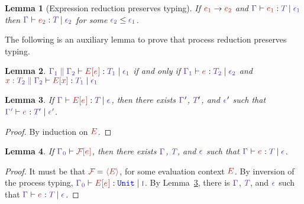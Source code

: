 \documentclass{article}
\newtheorem{lemma}{Lemma}
\begin{document}
\begin{lemma}[Expression reduction preserves typing]
  If $\E[1] \Reduces \E[2]$ and 
  $\HasType
      {\Ctx}
      {\E[1]}
      {\T}
      {\Eff[1]}$
  then 
  $\HasType
      {\Ctx}
      {\E[2]}
      {\T}
      {\Eff[2]}$
  for some $\Eff[2] \leq \Eff[1]$.
\end{lemma}

The following is an auxiliary lemma to prove that 
process reduction preserves typing.

\begin{lemma}
    $\HasType
      {\CtxExtUnord {\Ctx[1]}{\Ctx[2]}}
      {\EC[\E]}
      {\T[1]}
      {\Eff[1]}$ 
    if and only if
    $\HasType
      {\Ctx[1]}
      {\E}
      {\T[2]}
      {\Eff[2]}$
    and 
    $\HasType
      {\CtxExtUnord {\CtxVar x{\T[2]}}{\Ctx[2]}}
      {\EC[x]}
      {\T[1]}
      {\Eff[1]}$ 
\end{lemma}

\begin{lemma}
  \label{lemma:inversion-evaluation-context}
  If $\HasType{\Ctx}{\EC[\E]}{\T}{\Eff}$, then there exists $\Ctx'$,
  $\T'$, and $\Eff'$ such that $\HasType{\Ctx'}{\E}{\T'}{\Eff'}$.
\end{lemma}
\begin{proof}
  By induction on $\EC$.
\end{proof}

\begin{lemma}
  \label{lemma:inversion-process-evaluation-context}
  If $\ProcHasType{\Ctx_0} {\FCapp{\E}}$, then there exists $\Ctx$,
  $\T$, and $\Eff$ such that $\HasType{\Ctx}{\E}{\T}{\Eff}$.
\end{lemma}
\begin{proof}
  It must be that $\FC = \PExp \EC$, for some evaluation context $\EC$.
  By inversion of the process typing,
  $\HasType{\Ctx_0}{\EC[\E]}{\TBUnit}{\EffImpure}$.
  By Lemma~\ref{lemma:inversion-evaluation-context}, there is  $\Ctx$,
  $\T$, and $\Eff$ such that $\HasType{\Ctx}{\E}{\T}{\Eff}$.
\end{proof}
\end{document}
